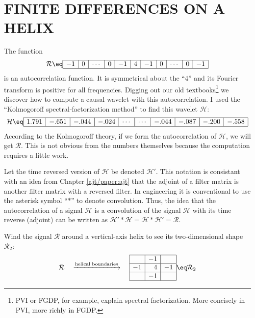 \section{FINITE DIFFERENCES ON A HELIX}
The function
\begin{equation}
\label{eqn:2dlapin1d}
\mathcal{R}
\eq
\begin{array}{|r|r|r|r|r|r|r|r|r|r|r|r|r|r|r|} \hline
-1&0&\cdots&0&-1&4&-1&0& \cdots&0&-1
\\ \hline
\end{array}
\end{equation}
is an autocorrelation function.
It is symmetrical about the ``4'' and its Fourier transform
is positive for all frequencies.
Digging out our old textbooks\footnote{
        PVI or FGDP, for example,
        explain spectral factorization.
        More concisely in PVI, more richly in FGDP.
        }
we discover
how to compute a causal wavelet with this autocorrelation.
I used the ``Kolmogoroff spectral-factorization method''
to find this wavelet $\mathcal{H}$:
\begin{equation}
{\mathcal{H}}
\eq
\begin{array}{|r|r|r|r|r|r|r|r|r|r|r|r|r|r|r|}
\hline
1.791&-.651&-.044&-.024&\cdots&\cdots&-.044&-.087&-.200&-.558 \\
\hline
\end{array}
\label{eqn:lapfacrow}
\end{equation}
According to the Kolmogoroff theory,
if we form the autocorrelation of
$\mathcal{H}$,
we will get $\mathcal{R}$.
This is not obvious from the numbers themselves
because the computation requires a little work.
\par
Let the time reversed version of
$\mathcal{H}$
be denoted
$\mathcal {H}'$.
This notation is consistant with an idea from
Chapter \ref{ajt/paper:ajt} that the adjoint of a filter matrix
is another filter matrix with a reversed filter.
In engineering it is conventional to use the asterisk symbol
``$\ast$'' to denote convolution.
Thus, the idea that the autocorrelation of a 
signal $\mathcal{H}$
is a convolution of the
signal $\mathcal{H}$
with its time reverse (adjoint)
can be written as
$ \mathcal{H}' \ast \mathcal{H} = \mathcal{H} \ast \mathcal{H}' = \mathcal{R}$.



\par
Wind the signal $\mathcal{R}$ around a
vertical-axis helix to see its two-dimensional shape $\mathcal{R}_2$:
\begin{equation}
\mathcal{R}
\quad
\xrightarrow{\rm helical \; boundaries}
\quad
\begin{array}{|r|r|r|}  \hline
& -1 & \\
\hline
-1 & 4 & -1\\
\hline
& -1 & \\
\hline
\end{array}
\eq
\mathcal{R}_2
\label{eqn:lap2d}
\end{equation}


